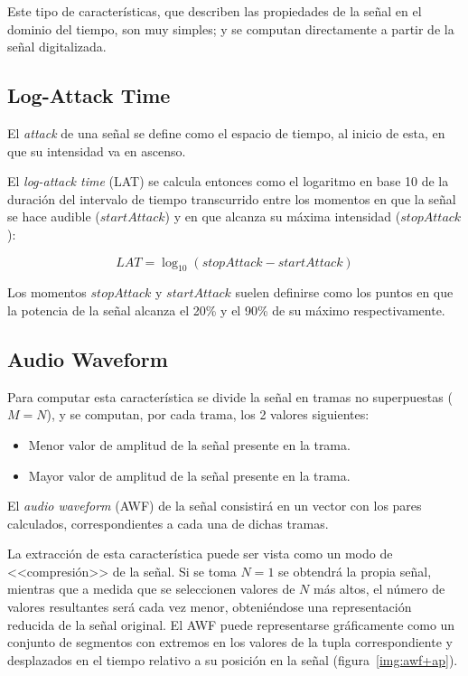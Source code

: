 Este tipo de características, que describen las propiedades de la señal en el dominio del tiempo, son muy simples;
y se computan directamente a partir de la señal digitalizada.

\subsection{Log-Attack Time}\label{subsec:log-attackTime}

El \textit{attack} de una señal se define como el espacio de tiempo, al inicio de esta, en que su intensidad va en ascenso.

El \textit{log-attack time} (LAT) se calcula entonces como el logaritmo en base 10 de la duración del intervalo de tiempo transcurrido entre los momentos en que la señal se hace audible ($startAttack$) y en que alcanza su máxima intensidad ($stopAttack$):

\begin{equation}
    \label{eq:LAT}
    LAT = \log_{10}{(stopAttack - startAttack)}
\end{equation}

Los momentos $stopAttack$ y $startAttack$ suelen definirse como los puntos en que la potencia de la señal alcanza el 20\% y el 90\% de su máximo respectivamente.

\subsection{Audio Waveform}\label{subsec:audioWaveform}

Para computar esta característica se divide la señal en tramas no superpuestas ($M = N$), y se computan, por cada trama, los 2 valores siguientes:

\begin{itemize}
    \item Menor valor de amplitud de la señal presente en la trama.
    \item Mayor valor de amplitud de la señal presente en la trama.
\end{itemize}

El \textit{audio waveform} (AWF) de la señal consistirá en un vector con los pares calculados, correspondientes a cada una de dichas tramas.

La extracción de esta característica puede ser vista como un modo de <<compresión>> de la señal.
Si se toma $N=1$ se obtendrá la propia señal, mientras que a medida que se seleccionen valores de $N$ más altos, el número de valores resultantes será cada vez menor, obteniéndose una representación reducida de la señal original.
El AWF puede representarse gráficamente como un conjunto de segmentos con extremos en los valores de la tupla correspondiente y desplazados en el tiempo relativo a su posición en la señal (figura~\ref{img:awf+ap}).

